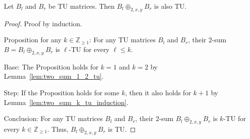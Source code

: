 \begin{lemma}\label{lem:two_sum_tu}
    Let $B_{l}$ and $B_{r}$ be TU matrices. Then $B_{l} \oplus_{2, x, y} B_{r}$ is also TU.
\end{lemma}

\begin{proof}
    Proof by induction.

    Proposition for any $k \in \mathbb{Z}_{\geq 1}$: For any TU matrices $B_{l}$ and $B_{r}$, their $2$-sum $B = B_{l} \oplus_{2, x, y} B_{r}$ is $\ell$-TU for every $\ell \leq k$.

    Base: The Proposition holds for $k = 1$ and $k = 2$ by Lemma~\ref{lem:two_sum_1_2_tu}.

    Step: If the Proposition holds for some $k$, then it also holds for $k + 1$ by Lemma~\ref{lem:two_sum_k_tu_induction}.

    Conclusion: For any TU matrices $B_{l}$ and $B_{r}$, their $2$-sum $B_{l} \oplus_{2, x, y} B_{r}$ is $k$-TU for every $k \in \mathbb{Z}_{\geq 1}$. Thus, $B_{l} \oplus_{2, x, y} B_{r}$ is TU.
\end{proof}
